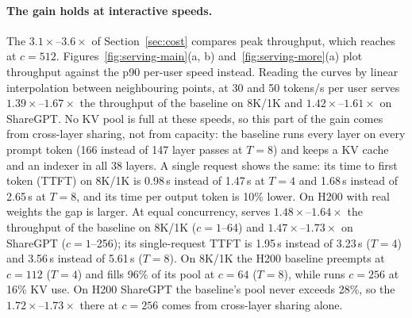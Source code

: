 \paragraph{The gain holds at interactive speeds.}
The $3.1\times$--$3.6\times$ of Section~\ref{sec:cost} compares peak throughput, which \ourmethod reaches at $c=512$.
Figures~\ref{fig:serving-main}(a, b) and~\ref{fig:serving-more}(a) plot throughput against the p90 per-user speed
instead. Reading the curves by linear interpolation between neighbouring points, at 30 and 50 tokens/s per user \ourmethod serves $1.39\times$--$1.67\times$ the throughput of
the baseline on 8K/1K and $1.42\times$--$1.61\times$ on ShareGPT. No KV pool is full at these speeds, so this part of
the gain comes from cross-layer sharing, not from capacity: the baseline runs every layer on every prompt token
(166 instead of 147 layer passes at $T=8$) and keeps a KV cache and an indexer in all 38 layers. A single request
shows the same: its time to first token (TTFT) on 8K/1K is 0.98\,s instead of 1.47\,s at $T=4$ and 1.68\,s instead of
2.65\,s at $T=8$, and its time per output token is 10\% lower. On H200 with real weights the gap is larger. At equal
concurrency, \ourmethod serves $1.48\times$--$1.64\times$ the throughput of the baseline on 8K/1K ($c=1$--64) and
$1.47\times$--$1.73\times$ on ShareGPT ($c=1$--256); its single-request TTFT is 1.95\,s instead of 3.23\,s ($T=4$)
and 3.56\,s instead of 5.61\,s ($T=8$). On 8K/1K the H200 baseline preempts at $c=112$ ($T=4$) and fills 96\% of its
pool at $c=64$ ($T=8$), while \ourmethod runs $c=256$ at 16\% KV use. On H200 ShareGPT the baseline's pool never
exceeds 28\%, so the $1.72\times$--$1.73\times$ there at $c=256$ comes from cross-layer sharing alone.

